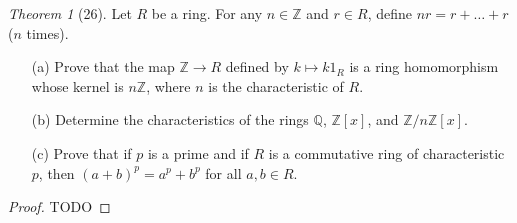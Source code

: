 \documentclass[12pt]{article}
\theoremstyle{remark}
\theoremstyle{named}
\newtheorem*{theorem}{Theorem}
\newcommand{\Z}{\mathbb Z}
\begin{document}
\begin{theorem}[26]
    Let \(R\) be a ring. For any \(n \in \Z\) and \(r \in R\), define \(nr = r + \dots + r\) (\(n\) times).
    \begin{enumerate}
        \item[(a)] Prove that the map \(\Z \to R\) defined by \(k \mapsto k1_R\) is a ring homomorphism whose kernel is \(n \Z\), where \(n\) is the characteristic of \(R\). 
        \item[(b)] Determine the characteristics of the rings \(\mathbb Q\), \(\Z[x]\), and \(\Z / n \Z [x]\).
        \item[(c)] Prove that if \(p\) is a prime and if \(R\) is a commutative ring of characteristic \(p\), then \((a + b)^p = a^p + b^p\) for all \(a, b \in R\). 
    \end{enumerate}
\end{theorem}

\begin{proof}
    TODO
\end{proof}
\end{document}
